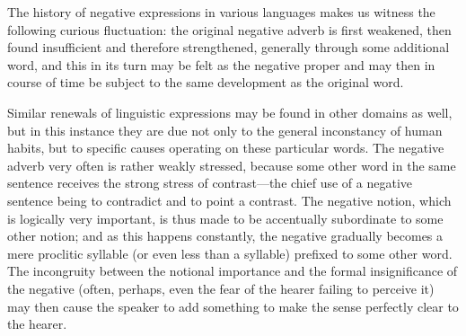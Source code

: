 \label{ch:1}
\label{p:first}

The history of negative expressions in various languages makes us witness the following curious fluctuation: the original negative adverb is first weakened, then found insufficient and therefore strengthened, generally through some additional word, and this in its turn may be felt as the negative proper and may then in course of time be subject to the same development as the original word.

Similar renewals of linguistic expressions may be found in other domains as well, but in this instance they are due not only to the general inconstancy of human habits, but to specific causes operating on these particular words. The negative adverb very often is rather weakly stressed, because some other word in the same sentence receives the strong stress of contrast---the chief use of a negative sentence being to contradict and to point a contrast. The negative notion, which is logically very important, is thus made to be accentually subordinate to some other notion; and as this happens constantly, the negative gradually becomes a mere proclitic syllable (or even less than a syllable) prefixed to some other word. The incongruity between the notional importance and the formal insignificance of the negative (often, perhaps, even the fear of the hearer failing to perceive it) may then cause the speaker to add something to make the sense perfectly clear to the hearer.

